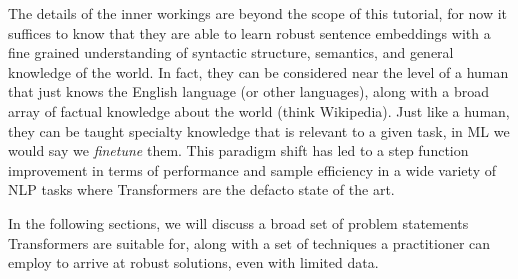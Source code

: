 The details of the inner workings are beyond the scope of this tutorial, for now it suffices to know that they are able to learn robust sentence embeddings with a fine grained understanding of syntactic structure, semantics, and general knowledge of the world.
In fact, they can be considered near the level of a human that just knows the English language (or other languages), along with a broad array of factual knowledge about the world (think Wikipedia).
Just like a human, they can be taught specialty knowledge that is relevant to a given task, in ML we would say we \textit{finetune} them.
This paradigm shift has led to a step function improvement in terms of performance and sample efficiency in a wide variety of NLP tasks where Transformers are the defacto state of the art.

In the following sections, we will discuss a broad set of problem statements Transformers are suitable for, along with a set of techniques a practitioner can employ to arrive at robust solutions, even with limited data.

